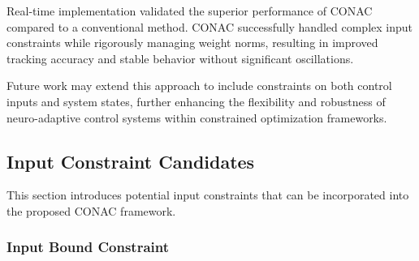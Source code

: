 \documentclass[letterpaper, journal]{IEEEtran}
\begin{document}
Real-time implementation validated the superior performance of CONAC compared to a conventional method. 
CONAC successfully handled complex input constraints while rigorously managing weight norms, resulting in improved tracking accuracy and stable behavior without significant oscillations.

Future work may extend this approach to include constraints on both control inputs and system states, further enhancing the flexibility and robustness of neuro-adaptive control systems within constrained optimization frameworks.

\appendix

\subsection{Input Constraint Candidates}\label{sec:appen:cstr} 

This section introduces potential input constraints that can be incorporated into the proposed CONAC framework.

\subsubsection{Input Bound Constraint}\label{sec:appen:cstr:input:bound}
\end{document}
